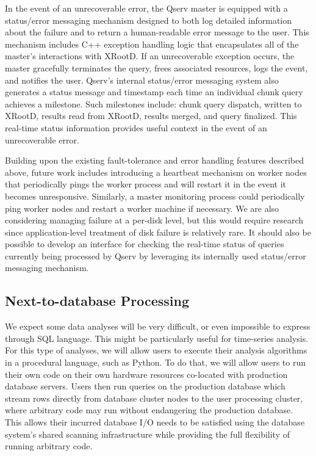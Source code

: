 \documentclass[DM,toc]{lsstdoc}
\begin{document}
In the event of an unrecoverable error, the Qserv master is equipped with a
status/error messaging mechanism designed to both log detailed information
about the failure and to return a human-readable error message to the user.
This mechanism includes C++ exception handling logic that encapsulates all of
the master's interactions with XRootD. If an unrecoverable exception occurs,
the master gracefully terminates the query, frees associated resources, logs
the event, and notifies the user. Qserv's internal status/error messaging
system also generates a status message and timestamp each time an individual
chunk query achieves a milestone. Such milestones include: chunk query
dispatch, written to XRootD, results read from XRootD, results merged, and
query finalized. This real-time status information provides useful context in
the event of an unrecoverable error.

Building upon the existing fault-tolerance and error handling features
described above, future work includes introducing a heartbeat mechanism on
worker nodes that periodically pings the worker process and will restart it in
the event it becomes unresponsive. Similarly, a master monitoring process
could periodically ping worker nodes and restart a worker machine if
necessary. We are also considering managing failure at a per-disk level, but
this would require research since application-level treatment of disk failure
is relatively rare. It should also be possible to develop an interface for
checking the real-time status of queries currently being processed by Qserv by
leveraging its internally used status/error messaging mechanism.

\subsection{Next-to-database Processing}\label{next-to-database-processing}

We expect some data analyses will be very difficult, or even impossible to
express through SQL language. This might be particularly useful for time-series
analysis. For this type of analyses, we will allow users to execute
their analysis algorithms in a procedural language, such as Python. To do
that, we will allow users to run their own code on their own hardware
resources co-located with production database servers. Users then run queries
on the production database which stream rows directly from database cluster
nodes to the user processing cluster, where arbitrary code may run without
endangering the production database. This allows their incurred database I/O
needs to be satisfied using the database system's shared scanning
infrastructure while providing the full flexibility of running arbitrary code.
\end{document}
